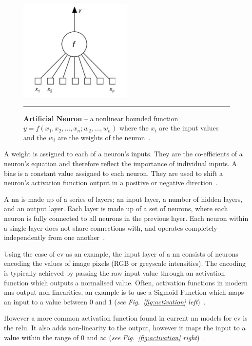 \begin{figure}[H]
    \centering
        \includegraphics[width=0.5\textwidth]{media/literature/artificial-neuron1.png}
        \rule{35em}{0.5pt}
        \caption[Example of an artifcial neuron]{\textbf{Artificial Neuron} -- a nonlinear bounded function $y = f(x_{1}, x_{2},\ldots,x_{n};w_{2},\ldots,w_{n})$ where the ${x_{i}}$ are the input values and the  ${w_{i}}$ are the weights of the neuron~\citep{Dreyfus2005}.}\label{fig:an}
\end{figure}


A weight is assigned to each of a neuron's inputs. They are the co-efficients of a neuron's equation and therefore reflect the importance of individual inputs. A bias is a constant value assigned to each neuron. They are used to shift a neuron's activation function output in a positive or negative direction~\citep{Malik2019weights}.

A \Gls{nn} is made up of a series of layers; an input layer,
a number of hidden layers, and an output layer. Each layer is
made up of a set of neurons, where each neuron is fully connected
to all neurons in the previous layer. Each neuron within a single layer
does not share connections with, and operates completely independently from one another~\citep{cs231n}.


Using the case of \Gls{cv} as an example, 
the input layer of a \Gls{nn} consists of
neurons encoding the values of image pixels (RGB or greyscale intensities).
The encoding is typically achieved by passing the raw input 
value through an activation function which outputs a normalised value. 
Often, activation functions in modern \Glspl{nn} output non-linearities, 
an example is to use a Sigmoid Function which maps an input to a value between 0 and 1 
(\textit{see Fig.~\ref{fig:activation} \textit{left}})~\citep{Nielsen2015}.

However a more common activation function found in current \gls{nn} models for \gls{cv} is the \gls{relu}.
It also adds non-linearity to the output, however it maps the input to a value
within the range of $0 \text{ and } \infty$ (\textit{see Fig.~\ref{fig:activation} \textit{right}})~\citep{Malik2019activation}.

